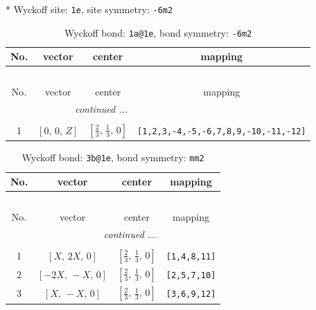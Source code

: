\documentclass[fleqn,8pt]{jsarticle}
\begin{document}
* Wyckoff site: {\tt 1e}, site symmetry: {\tt -6m2}
\renewcommand{\arraystretch}{1.2}
\begin{longtable}{cccc}
\caption{Wyckoff bond: {\tt 1a@1e}, bond symmetry: {\tt -6m2}}
 \\
 \hline \hline
No. & vector & center & mapping \\ \hline \endfirsthead

\multicolumn{3}{l}{\tablename\ \thetable{}} \\
 \hline \hline
No. & vector & center & mapping \\ \hline \endhead

 \hline \hline
\multicolumn{3}{r}{\footnotesize\it continued ...} \\ \endfoot

 \hline \hline
\multicolumn{3}{r}{} \\ \endlastfoot

1 & $\left[ 0,\, 0,\, Z \right]$ & $\left[ \frac{2}{3},\, \frac{1}{3},\, 0 \right]$ & {\tt [1,2,3,-4,-5,-6,7,8,9,-10,-11,-12]} \\
\end{longtable}
\renewcommand{\arraystretch}{1.2}
\begin{longtable}{cccc}
\caption{Wyckoff bond: {\tt 3b@1e}, bond symmetry: {\tt mm2}}
 \\
 \hline \hline
No. & vector & center & mapping \\ \hline \endfirsthead

\multicolumn{3}{l}{\tablename\ \thetable{}} \\
 \hline \hline
No. & vector & center & mapping \\ \hline \endhead

 \hline \hline
\multicolumn{3}{r}{\footnotesize\it continued ...} \\ \endfoot

 \hline \hline
\multicolumn{3}{r}{} \\ \endlastfoot

1 & $\left[ X,\, 2 X,\, 0 \right]$ & $\left[ \frac{2}{3},\, \frac{1}{3},\, 0 \right]$ & {\tt [1,4,8,11]} \\ \hline
2 & $\left[ - 2 X,\, - X,\, 0 \right]$ & $\left[ \frac{2}{3},\, \frac{1}{3},\, 0 \right]$ & {\tt [2,5,7,10]} \\ \hline
3 & $\left[ X,\, - X,\, 0 \right]$ & $\left[ \frac{2}{3},\, \frac{1}{3},\, 0 \right]$ & {\tt [3,6,9,12]} \\
\end{longtable}
\renewcommand{\arraystretch}{1.2}
\end{document}
